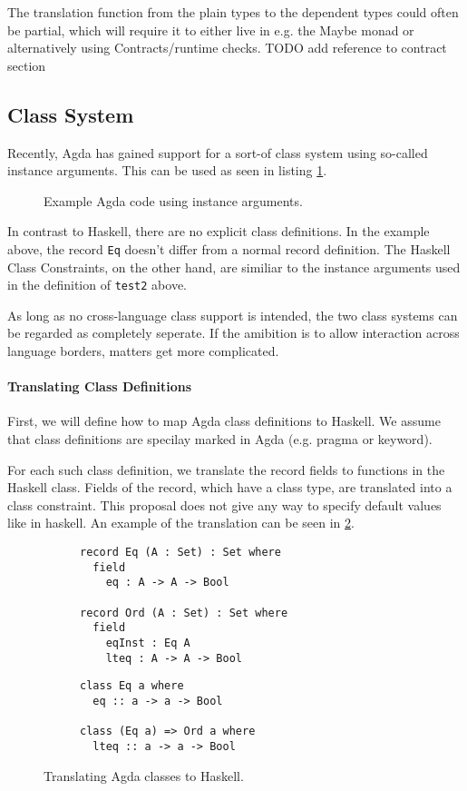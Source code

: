 \documentclass[12pt, a4paper, twoside]{report}
\begin{document}
The translation function from the plain types to the dependent types could often be partial,
which will require it to either live in e.g. the Maybe monad or alternatively using Contracts/runtime checks.
TODO add reference to contract section

\subsection{Class System}
Recently, Agda has gained support for a sort-of class system using so-called instance arguments. This can
be used as seen in listing \ref{lst:agda-inst-ex}.
\begin{figure}

\caption{Example Agda code using instance arguments.}
\label{lst:agda-inst-ex}
\end{figure}

In contrast to Haskell, there are no explicit class definitions. In the example above,
the record \texttt{Eq} doesn't differ from a normal record definition.
The Haskell Class Constraints, on the other hand, are similiar to the instance
arguments used in the definition of \texttt{test2} above.

As long as no cross-language class support is intended, the two class systems can be
regarded as completely seperate. If the amibition is to allow interaction across
language borders, matters get more complicated.

\paragraph{Translating Class Definitions}
First, we will define how to map Agda class definitions to Haskell. We assume
that class definitions are specilay marked in Agda (e.g. pragma or keyword).

For each such class definition, we translate the record fields to functions
in the Haskell class. Fields of the record, which have a class type, are
translated into a class constraint. This proposal does not give any way
to specify default values like in haskell. An example of the translation
can be seen in \ref{lst:cls-agda-hs}.
\begin{figure}
\begin{subfigure}[b]{0.5\textwidth}
\begin{lstlisting}
record Eq (A : Set) : Set where
  field
    eq : A -> A -> Bool

record Ord (A : Set) : Set where
  field
    eqInst : Eq A
    lteq : A -> A -> Bool
\end{lstlisting}
\end{subfigure}
\hspace{10pt}
\begin{subfigure}[b]{0.5\textwidth}
\begin{lstlisting}
class Eq a where
  eq :: a -> a -> Bool

class (Eq a) => Ord a where
  lteq :: a -> a -> Bool
\end{lstlisting}
\end{subfigure}
\caption{Translating Agda classes to Haskell.}
\label{lst:cls-agda-hs}
\end{figure}
\end{document}

